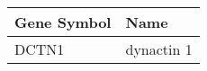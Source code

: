 \begin{tabular}{ll}
\toprule
Gene Symbol &       Name \\
\midrule
      DCTN1 & dynactin 1 \\
\bottomrule
\end{tabular}
